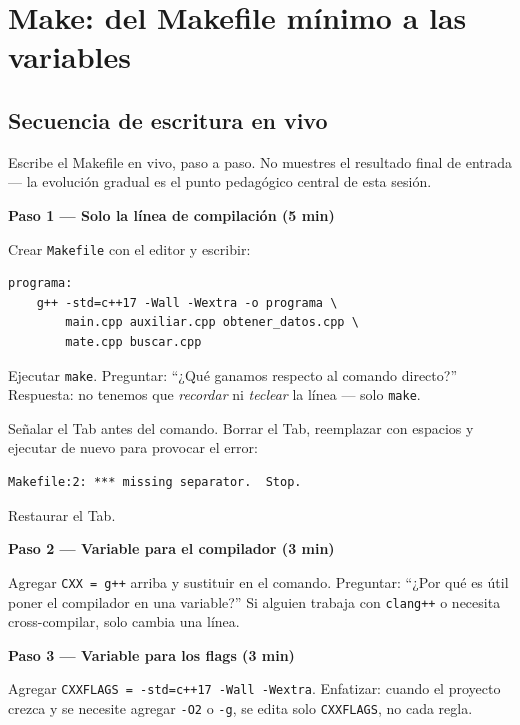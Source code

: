 \documentclass[12pt, oneside]{article}
\begin{document}
\section{Make: del Makefile mínimo a las variables}

\subsection{Secuencia de escritura en vivo}

\begin{notaprofesor}
  Escribe el Makefile en vivo, paso a paso.  No muestres el resultado final
  de entrada — la evolución gradual es el punto pedagógico central de esta sesión.

  \medskip
  \textbf{Paso 1 — Solo la línea de compilación (5 min)}

  Crear \texttt{Makefile} con el editor y escribir:
\begin{verbatim}
programa:
	g++ -std=c++17 -Wall -Wextra -o programa \
	    main.cpp auxiliar.cpp obtener_datos.cpp \
	    mate.cpp buscar.cpp
\end{verbatim}
  Ejecutar \texttt{make}.  Preguntar: ``¿Qué ganamos respecto al comando
  directo?''  Respuesta: no tenemos que \textit{recordar} ni \textit{teclear}
  la línea — solo \texttt{make}.
  \par\smallskip
  Señalar el Tab antes del comando.  Borrar el Tab, reemplazar con espacios
  y ejecutar de nuevo para provocar el error:
\begin{verbatim}
Makefile:2: *** missing separator.  Stop.
\end{verbatim}
  Restaurar el Tab.

  \medskip
  \textbf{Paso 2 — Variable para el compilador (3 min)}

  Agregar \texttt{CXX = g++} arriba y sustituir en el comando.  Preguntar:
  ``¿Por qué es útil poner el compilador en una variable?''  Si alguien
  trabaja con \texttt{clang++} o necesita cross-compilar, solo cambia una
  línea.

  \medskip
  \textbf{Paso 3 — Variable para los flags (3 min)}

  Agregar \texttt{CXXFLAGS = -std=c++17 -Wall -Wextra}.  Enfatizar: cuando
  el proyecto crezca y se necesite agregar \texttt{-O2} o \texttt{-g},
  se edita solo \texttt{CXXFLAGS}, no cada regla.


\end{notaprofesor}
\end{document}
